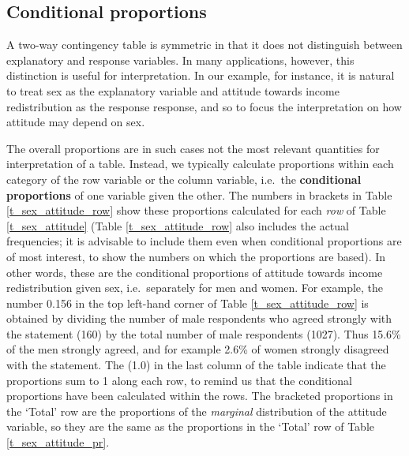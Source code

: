\subsection{Conditional proportions}
\label{ss_descr1_2cat_cond}

A two-way contingency table is symmetric in that it does not distinguish
between explanatory and response variables. In many applications,
however, this distinction is useful for interpretation. In our example,
for instance, it is natural to treat sex as the explanatory variable and
attitude towards income redistribution as the response response, and so
to focus the interpretation on how attitude may depend on sex.

The overall proportions are in such cases not the most relevant
quantities for interpretation of a table. Instead, we typically
calculate proportions within each category of the row variable or the
column variable, i.e.\ the \textbf{conditional proportions} of one
variable given the other. The numbers in brackets in Table
\ref{t_sex_attitude_row} show these proportions calculated for each
\emph{row} of Table \ref{t_sex_attitude} (Table \ref{t_sex_attitude_row}
also includes the actual frequencies; it is advisable to include them
even when conditional proportions are of most interest, to show the
numbers on which the proportions are based). In other words, these are
the conditional proportions of attitude towards income redistribution
given sex, i.e.\ separately for men and women. For example, the
number 0.156 in the top left-hand corner of Table
\ref{t_sex_attitude_row} is obtained by dividing the number of male
respondents who agreed strongly with the statement (160) by the total
number of male respondents (1027). Thus 15.6\% of the men strongly
agreed, and for example 2.6\% of women strongly disagreed with the
statement. The (1.0) in the last column of the table indicate that the
proportions sum to 1 along each row, to remind us that the conditional
proportions have been calculated within the rows. The bracketed
proportions in the `Total' row are the proportions of the
\emph{marginal} distribution of the attitude variable, so they are the
same as the proportions in the `Total' row of Table
\ref{t_sex_attitude_pr}.

